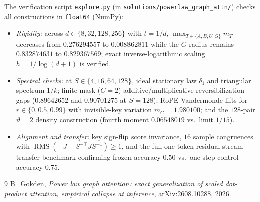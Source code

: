 \documentclass[11pt]{article}
\theoremstyle{plain}
\theoremstyle{definition}
\theoremstyle{remark}
\DeclareMathOperator{\RMS}{RMS}
\begin{document}
The verification script \texttt{explore.py} (in \texttt{solutions/powerlaw\_graph\_attn/}) checks all constructions in \texttt{float64} (NumPy):
\begin{itemize}[leftmargin=2em,itemsep=2pt]
\item \emph{Rigidity:} across $d \in \{8, 32, 128, 256\}$ with $t = 1/d$, $\max_{T \in \{A, B, U, G\}} m_T$ decreases from $0.276294557$ to $0.008862811$ while the $G$-radius remains $0.832874631$ to $0.829367569$; exact inverse-logarithmic scaling $h = 1/\log(d+1)$ is verified.
\item \emph{Spectral checks:} at $S \in \{4, 16, 64, 128\}$, ideal stationary law $\delta_1$ and triangular spectrum $1/k$; finite-mask ($C = 2$) additive/multiplicative reversibilization gaps ($0.89642652$ and $0.90701275$ at $S = 128$); RoPE Vandermonde lifts for $r \in \{0, 0.5, 0.99\}$ with invisible-key variation $m_G = 1.980100$; and the $128$-pair $\vartheta = 2$ density construction (fourth moment $0.06548019$ vs.\ limit $1/15$).
\item \emph{Alignment and transfer:} key sign-flip score invariance, $16$ sample congruences with $\RMS(-J - S^{-\top} J S^{-1}) \ge 1$, and the full one-token residual-stream transfer benchmark confirming frozen accuracy $0.50$ vs.\ one-step control accuracy $0.75$.
\end{itemize}

\begin{thebibliography}{9}
B.~Gokden,
\emph{Power law graph attention: exact generalization of scaled dot-product attention, empirical collapse at inference},
\href{https://arxiv.org/abs/2608.10288}{arXiv:2608.10288}, 2026.
\end{thebibliography}
\end{document}
